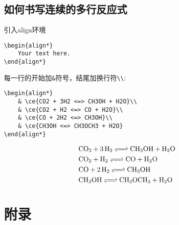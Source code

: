 \documentclass[UTF8, a4paper]{article}
\begin{document}
\subsection{如何书写连续的多行反应式}
\noindent 引入align环境
\begin{Verbatim}[tabsize=4]
\begin{align*}
	Your text here.
\end{align*}
\end{Verbatim}
每一行的开始加\verb|&|符号，结尾加换行符\verb|\\|:\\
\begin{minipage}{.5\textwidth}
\begin{Verbatim}[tabsize=4]
\begin{align*}
	& \ce{CO2 + 3H2 <=> CH3OH + H2O}\\
	& \ce{CO2 + H2 <=> CO + H2O}\\
	& \ce{CO + 2H2 <=> CH3OH}\\
	& \ce{CH3OH <=> CH3OCH3 + H2O}
\end{align*}
\end{Verbatim}
\end{minipage}
\begin{minipage}{.5\textwidth}
\begin{align*}
	& \ce{CO2 + 3H2 <=> CH3OH + H2O}\\
	& \ce{CO2 + H2 <=> CO + H2O}\\
	& \ce{CO + 2H2 <=> CH3OH}\\
	& \ce{CH3OH <=> CH3OCH3 + H2O}
\end{align*}
\end{minipage}


\section{附录}
\end{document}
